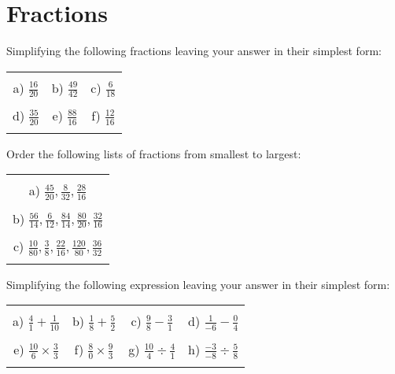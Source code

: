 \documentclass[12pt]{article}
\begin{document}
\section{Fractions}
Simplifying the following fractions leaving your answer in their simplest form:
\begin{table}[h!]
\centering
\begin{tabular}{c c c}
\hspace{2cm} & \hspace{6cm} & \hspace{4cm}\\
a) $\frac{16}{20}$ & b) $\frac{49}{42}$ & c) $\frac{6}{18}$\\ \\
d) $\frac{35}{20}$ & e) $\frac{88}{16}$ & f) $\frac{12}{16}$\\ \\
\end{tabular}
\end{table}
\newline
Order the following lists of fractions from smallest to largest:
\begin{table}[h!]
\centering
\begin{tabular}{c}
\hspace{4cm}\\
a) $\frac{45}{20}, \frac{8}{32}, \frac{28}{16}$\\ \\
b) $\frac{56}{14}, \frac{6}{12}, \frac{84}{14}, \frac{80}{20}, \frac{32}{16}$\\ \\
c) $\frac{10}{80}, \frac{3}{8}, \frac{22}{16}, \frac{120}{80}, \frac{36}{32}$\\ \\
\end{tabular}
\end{table}
\newline
Simplifying the following expression leaving your answer in their simplest form:
\begin{table}[h!]
\centering
\begin{tabular}{c c c c}
\hspace{4cm} & \hspace{4cm} & \hspace{4cm} & \hspace{4cm}\\
a) $\frac{{4}}{{1}} + \frac{{1}}{{10}}$ & b) $\frac{{1}}{{8}} + \frac{{5}}{{2}}$ & c) $\frac{{9}}{{8}} - \frac{{3}}{{1}}$ & d) $\frac{{1}}{{-6}} - \frac{{0}}{{4}}$ \\ \\
e) $\frac{{10}}{{6}}\times\frac{{3}}{{3}}$ & f) $\frac{{8}}{{0}}\times\frac{{9}}{{3}}$ & g) $\frac{{10}}{{4}}\div\frac{{4}}{{1}}$ & h) $\frac{{-3}}{{-8}}\div\frac{{5}}{{8}}$ \\ \\
\end{tabular}
\end{table}
\newline
\newpage
\end{document}
